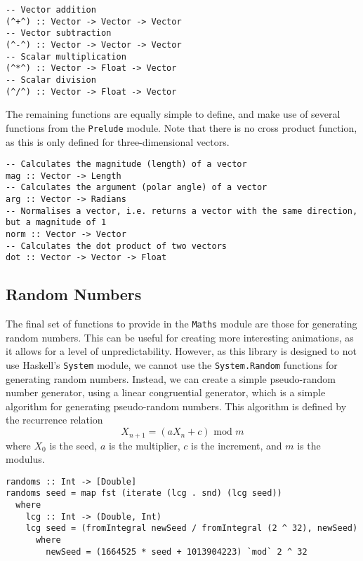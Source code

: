 \documentclass[../main.tex]{subfiles}
\begin{document}
                \begin{lstlisting}[label={lst:vectorOps}, caption={The vector operators.}]
-- Vector addition
(^+^) :: Vector -> Vector -> Vector
-- Vector subtraction
(^-^) :: Vector -> Vector -> Vector
-- Scalar multiplication
(^*^) :: Vector -> Float -> Vector
-- Scalar division
(^/^) :: Vector -> Float -> Vector\end{lstlisting}

                The remaining functions are equally simple to define, and make use of several
                    functions from the \texttt{Prelude} module.
                Note that there is no cross product function, as this is only defined for
                    three-dimensional vectors.

                \begin{lstlisting}[label={lst:vectorFns}, caption={The remaining vector functions.}]
-- Calculates the magnitude (length) of a vector
mag :: Vector -> Length
-- Calculates the argument (polar angle) of a vector
arg :: Vector -> Radians
-- Normalises a vector, i.e. returns a vector with the same direction, but a magnitude of 1
norm :: Vector -> Vector
-- Calculates the dot product of two vectors
dot :: Vector -> Vector -> Float\end{lstlisting}

        \subsection{Random Numbers}
            The final set of functions to provide in the \texttt{Maths} module are those
                for generating random numbers.
            This can be useful for creating more interesting animations, as it allows for a
                level of unpredictability.
            However, as this library is designed to not use Haskell's \texttt{System}
                module, we cannot use the \texttt{System.Random} functions for generating
                random numbers.
            Instead, we can create a simple pseudo-random number generator, using a linear
                congruential generator, which is a simple algorithm for generating
                pseudo-random numbers.
            This algorithm is defined by the recurrence relation $$X_{n+1} = (aX_n + c)
                    \text{ mod } m$$ where $X_0$ is the seed, $a$ is the multiplier, $c$ is the
                increment, and $m$ is the modulus.

            \begin{lstlisting}[label={lst:random}, caption={The random number generator, 
                (\texttt{randoms}) which uses a linear congruential generator to generate an 
                infinite list of pseudo-random numbers, mapped to the range [0, 1].}]
randoms :: Int -> [Double]
randoms seed = map fst (iterate (lcg . snd) (lcg seed))
  where
    lcg :: Int -> (Double, Int)
    lcg seed = (fromIntegral newSeed / fromIntegral (2 ^ 32), newSeed)
      where
        newSeed = (1664525 * seed + 1013904223) `mod` 2 ^ 32\end{lstlisting}
\end{document}
